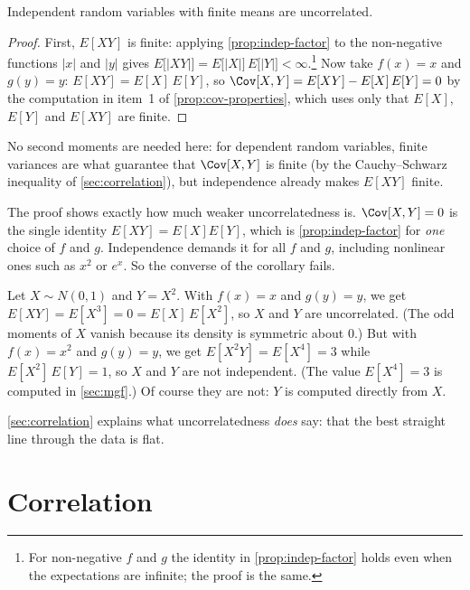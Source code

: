\begin{corollary}
	Independent random variables with finite means are uncorrelated.
\end{corollary}

\begin{proof}
	First, $E[XY]$ is finite: applying \autoref{prop:indep-factor} to the non-negative functions $|x|$ and $|y|$ gives $E\bigl[|XY|\bigr]=E\bigl[|X|\bigr]\,E\bigl[|Y|\bigr]<\infty$.\footnote{For non-negative $f$ and $g$ the identity in \autoref{prop:indep-factor} holds even when the expectations are infinite; the proof is the same.}
	Now take $f(x)=x$ and $g(y)=y$: $E[XY]=E[X]\,E[Y]$, so $\Cov[X,Y]=E[XY]-E[X]\,E[Y]=0$ by the computation in item~1 of \autoref{prop:cov-properties}, which uses only that $E[X]$, $E[Y]$ and $E[XY]$ are finite.
\end{proof}

No second moments are needed here: for dependent random variables, finite variances are what guarantee that $\Cov[X,Y]$ is finite (by the Cauchy--Schwarz inequality of \autoref{sec:correlation}), but independence already makes $E[XY]$ finite.

The proof shows exactly how much weaker uncorrelatedness is.
$\Cov[X,Y]=0$ is the single identity $E[XY]=E[X]E[Y]$, which is \autoref{prop:indep-factor} for \emph{one} choice of $f$ and $g$.
Independence demands it for all $f$ and $g$, including nonlinear ones such as $x^{2}$ or $e^{x}$.
So the converse of the corollary fails.

\begin{eg}\label{eg:uncorrelated-dependent}
	Let $X\sim N(0,1)$ and $Y=X^{2}$.
	With $f(x)=x$ and $g(y)=y$, we get $E[XY]=E[X^{3}]=0=E[X]\,E[X^{2}]$, so $X$ and $Y$ are uncorrelated.
	(The odd moments of $X$ vanish because its density is symmetric about $0$.)
	But with $f(x)=x^{2}$ and $g(y)=y$, we get $E[X^{2}Y]=E[X^{4}]=3$ while $E[X^{2}]\,E[Y]=1$, so $X$ and $Y$ are not independent.
	(The value $E[X^{4}]=3$ is computed in \autoref{sec:mgf}.)
	Of course they are not: $Y$ is computed directly from $X$.
\end{eg}

\autoref{sec:correlation} explains what uncorrelatedness \emph{does} say: that the best straight line through the data is flat.
\suppend

\section{Correlation}
\label{sec:correlation}

